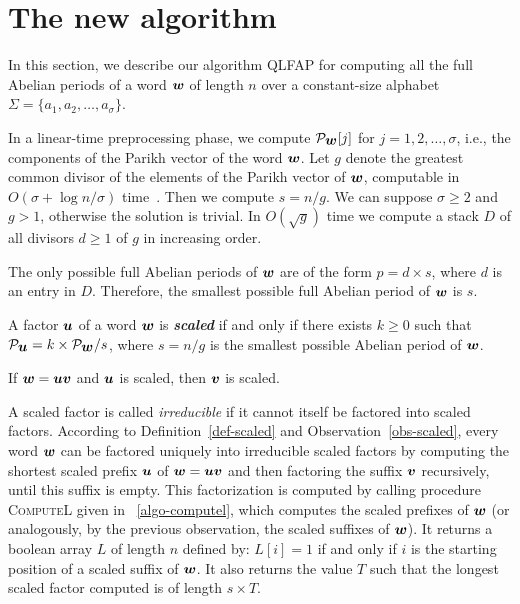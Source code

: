\documentclass[3p]{elsarticle}
\def\PV{\mathcal{P}}
\def\PVW{\mathcal{P}_{\s{w}}}
\def\s#1{\mbox{\boldmath $#1$}}
\def\itbf#1{\textit{\textbf{#1}}}
\begin{document}
 
\section{The new algorithm}\label{sec-nohead-notail}


In this section, we describe our algorithm QLFAP for computing all the full Abelian periods of a word $\s{w}$ of length $n$ over a constant-size alphabet $\Sigma=\{a_1,a_2,\ldots,a_\sigma\}$.

In a linear-time preprocessing phase, we compute $\PVW[j]$ for $j = 1,2,\ldots,\sigma$, 
 i.e., the components of the Parikh vector of the word $\s{w}$.
Let $g$ denote the greatest common divisor of the
 elements of the Parikh vector of $\s{w}$, computable in
 $O(\sigma + \log n/\sigma)$ time~\cite{Bradley1970}.
Then we compute $s = n/g$.
We can suppose $\sigma \ge 2$ and $g > 1$, otherwise the solution is trivial.
In $O(\sqrt{g})$ time we compute a stack $D$ of all divisors $d \ge 1$ of $g$
 in increasing order. 

\begin{obs}
\label{obs-poss}
The only possible full Abelian periods of $\s{w}$
 are of the form $p = d\times s$, where $d$ is an entry in $D$.
Therefore, the smallest possible full Abelian period of $\s{w}$ is $s$.
\end{obs}

\begin{defi}[scaled]
\label{def-scaled}
A factor $\s{u}$ of a word $\s{w}$ is \itbf{scaled} if and only if there exists $k\geqslant 0$ such that $\PV_{\s{u}} = k \times \PVW / s$, where $s=n/g$ is
 the smallest possible Abelian period of $\s{w}$.
\end{defi}

\begin{obs}
\label{obs-scaled}
If $\s{w}=\s{uv}$ and $\s{u}$ is scaled, then $\s{v}$ is scaled.
\end{obs}

A scaled factor is called \emph{irreducible} if it cannot itself be factored into scaled factors. According to Definition~\ref{def-scaled} and 
 Observation~\ref{obs-scaled}, 
 every word $\s{w}$
 can be factored uniquely into irreducible scaled factors by computing the shortest scaled 
 prefix $\s{u}$ of $\s{w}=\s{uv}$ and then factoring the suffix $\s{v}$ recursively, 
 until this suffix is empty. This factorization is computed by calling procedure
\textsc{ComputeL} given in \figurename~\ref{algo-computel}, which computes the scaled prefixes of $\s{w}$ (or analogously, by the previous observation, the scaled suffixes of $\s{w}$). 
It returns a boolean array $L$ of length $n$ defined by: $L[i]=1$ if and only if $i$ is the starting position of a scaled suffix of $\s{w}$. 
It also returns the value $T$ such that the longest scaled factor computed is of length $s\times T$.
\end{document}
